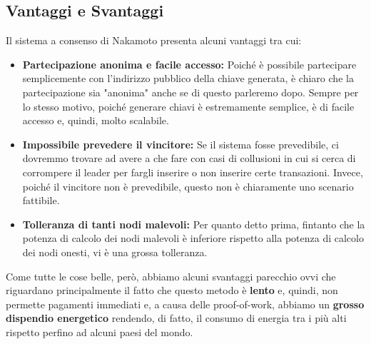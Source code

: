 \subsection{Vantaggi e Svantaggi}
Il sistema a consenso di Nakamoto presenta alcuni vantaggi tra cui:
\begin{itemize}
    \item \textbf{Partecipazione anonima e facile accesso:} Poiché è possibile partecipare semplicemente con l'indirizzo pubblico della chiave generata, è chiaro che la partecipazione sia "anonima" anche se di questo parleremo dopo. Sempre per lo stesso motivo, poiché generare chiavi è estremamente semplice, è di facile accesso e, quindi, molto scalabile.
    \item \textbf{Impossibile prevedere il vincitore:} Se il sistema fosse prevedibile, ci dovremmo trovare ad avere a che fare con casi di collusioni in cui si cerca di corrompere il leader per fargli inserire o non inserire certe transazioni. Invece, poiché il vincitore non è prevedibile, questo non è chiaramente uno scenario fattibile.
    \item \textbf{Tolleranza di tanti nodi malevoli: }Per quanto detto prima, fintanto che la potenza di calcolo dei nodi malevoli è inferiore rispetto alla potenza di calcolo dei nodi onesti, vi è una grossa tolleranza.
\end{itemize}
Come tutte le cose belle, però, abbiamo alcuni svantaggi parecchio ovvi che riguardano principalmente il fatto che questo metodo è \textbf{lento} e, quindi, non permette pagamenti immediati e, a causa delle proof-of-work, abbiamo un \textbf{grosso dispendio energetico} rendendo, di fatto, il consumo di energia tra i più alti rispetto perfino ad alcuni paesi del mondo.
